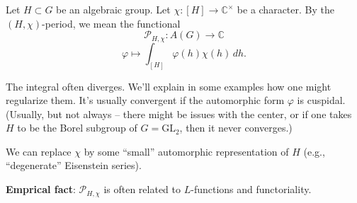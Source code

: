 \documentclass[reqno]{amsart} 
\begin{document}
Let $H \subset G$ be an algebraic group.  Let $\chi :[H] \rightarrow \mathbb{C}^\times$ be a character.  By the $(H, \chi)$-period, we mean the functional
\begin{equation*}
  \mathcal{P}_{H, \chi} : A(G) \rightarrow \mathbb{C}
\end{equation*}
\begin{equation*}
  \varphi \mapsto \int_{[H]} \varphi(h) \chi(h) \, d h.
\end{equation*}
\begin{remark}\label{remark:cq6tho091q}
  The integral often diverges.  We'll explain in some examples how one might regularize them.  It's usually convergent if the automorphic form $\varphi$ is cuspidal.  (Usually, but not always -- there might be issues with the center, or if one takes $H$ to be the Borel subgroup of $G = \mathrm{GL}_2$, then it never converges.)
\end{remark}

\begin{remark}\label{remark:cq6tho3lbh}
  We can replace $\chi$ by some ``small'' automorphic representation of $H$ (e.g., ``degenerate'' Eisenstein series).
\end{remark}

\textbf{Emprical fact}: $\mathcal{P}_{H, \chi}$ is often related to $L$-functions and functoriality.
\end{document}
